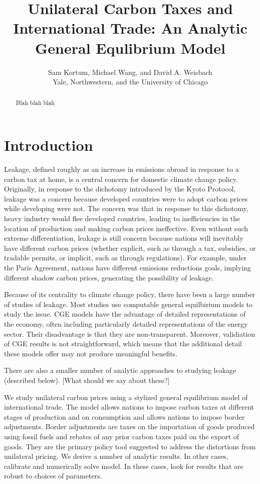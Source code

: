 \documentclass[notitlepage,12pt]{article}
\begin{document}
\title{Unilateral Carbon Taxes and International Trade: An Analytic General
Equlibrium Model}
\author{Sam Kortum, Michael Wang, and David A. Weisbach \\
Yale, Northwestern, and the University of Chicago}
\maketitle

\begin{abstract}
Blah blah blah
\end{abstract}

\section{Introduction}

Leakage, defined roughly as an increase in emissions abroad in response to a
carbon tax at home, is a central concern for domestic climate change policy.
Originally, in response to the dichotomy introduced by the Kyoto Protocol,
leakage was a concern because developed countries were to adopt carbon
prices while developing were not. The concern was that in response to this
dichotomy, heavy industry would flee developed countries, leading to
inefficiencies in the location of production and making carbon prices
ineffective. Even without such extreme differentiation, leakage is still
concern because nations will inevitably have different carbon prices
(whether explicit, such as through a tax, subsidies, or tradable permits, or
implicit, such as through regulations). For example, under the Paris
Agreement, nations have different emissions reductions goals, implying
different shadow carbon prices, generating the possibility of leakage.

Because of its centrality to climate change policy, there have been a large
number of studies of leakage. Most studies use computable general
equilbirium models to study the issue. CGE models have the advantage of
detailed representations of the economy, often including particularly
detailed representations of the energy sector. Their disadvantage is that
they are non-transparent. Moreover, validiation of CGE results is not
straightforward, which means that the additional detail these models offer
may not produce meaningful benefits.

There are also a smaller number of analytic approaches to studying leakage
(described below). [What should we say about these?]

We study unilateral carbon prices using a stylized general equilibrium model
of international trade. The model allows nations to impose carbon taxes at
different stages of production and on consumption and allows nations to
impose border adjustments. Border adjustments are taxes on the importation
of goods produced using fossil fuels and rebates of any prior carbon taxes
paid on the export of goods. They are the primary policy tool suggested to
address the distortions from unilateral pricing. We derive a number of
analytic results. In other cases, calibrate and numerically solve model. In
these cases, look for results that are robust to choices of parameters.
\end{document}
